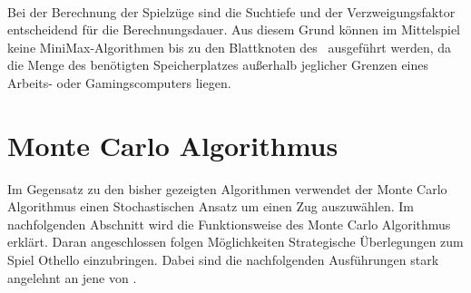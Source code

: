 \\Bei der Berechnung der Spielzüge sind die Suchtiefe und der Verzweigungsfaktor entscheidend für die Berechnungsdauer. Aus diesem Grund können im Mittelspiel keine MiniMax-Algorithmen bis zu den Blattknoten des \gtrees\ ausgeführt werden, da die Menge des benötigten Speicherplatzes außerhalb jeglicher Grenzen eines Arbeits- oder Gamingscomputers liegen.

\section{Monte Carlo Algorithmus}
\label{mc_algo}
Im Gegensatz zu den bisher gezeigten Algorithmen verwendet der Monte Carlo Algorithmus einen Stochastischen Ansatz um einen Zug auszuwählen. Im nachfolgenden Abschnitt wird die Funktionsweise des Monte Carlo Algorithmus erklärt. Daran angeschlossen folgen Möglichkeiten Strategische Überlegungen zum Spiel Othello einzubringen. Dabei sind die nachfolgenden Ausführungen stark angelehnt an jene von \cite{nijssen_2007}.
